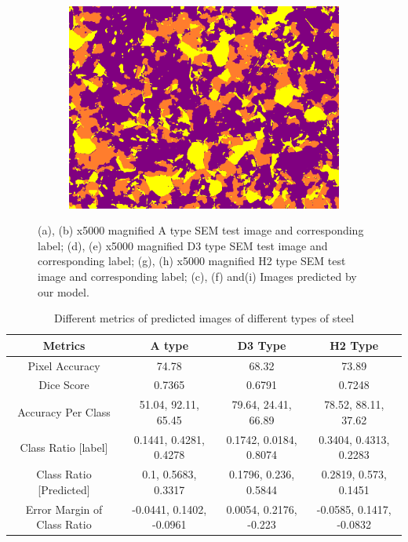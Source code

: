 \documentclass[]{article}
\begin{document}
\begin{figure}[!h]
\begin{subfigure}[b]{0.3\textwidth}
		\includegraphics[width=\textwidth]{images/inference/D3-type-P.png}
		\caption{}
		\label{fig:D3-type-pred}
	\end{subfigure}
	
	\caption{(a), (b) x5000 magnified A type SEM test image and corresponding label; (d), (e) x5000 magnified D3 type SEM test image and corresponding label; (g), (h) x5000 magnified H2 type SEM test image and corresponding label; (c), (f) and(i) Images predicted by our model.}
	\label{fig:diffsteeldiffmag}
\end{figure}


\begin{table}[h!]
	\centering
	\begin{tabular}{|c|c|c|c|}
		\hline
		\textbf{Metrics} & \textbf{A type} & \textbf{D3 Type} & \textbf{H2 Type}\\
		\hline
		Pixel Accuracy & 74.78 & 68.32 & 73.89 \\
		\hline
		Dice Score & 0.7365 & 0.6791 & 0.7248 \\
		\hline
		Accuracy Per Class & 51.04, 92.11, 65.45 & 79.64, 24.41, 66.89 & 78.52, 88.11, 37.62 \\
		\hline
		Class Ratio [label] & 0.1441, 0.4281, 0.4278 & 0.1742, 0.0184, 0.8074 & 0.3404, 0.4313, 0.2283 \\
		\hline
		Class Ratio [Predicted] & 0.1, 0.5683, 0.3317 & 0.1796, 0.236, 0.5844 & 0.2819, 0.573, 0.1451 \\
		\hline
		Error Margin of Class Ratio & -0.0441, 0.1402, -0.0961 & 0.0054, 0.2176, -0.223 & -0.0585, 0.1417, -0.0832 \\
		\hline
	\end{tabular}
	\caption{Different metrics of predicted images of different types of steel}
\end{table}
\end{document}
